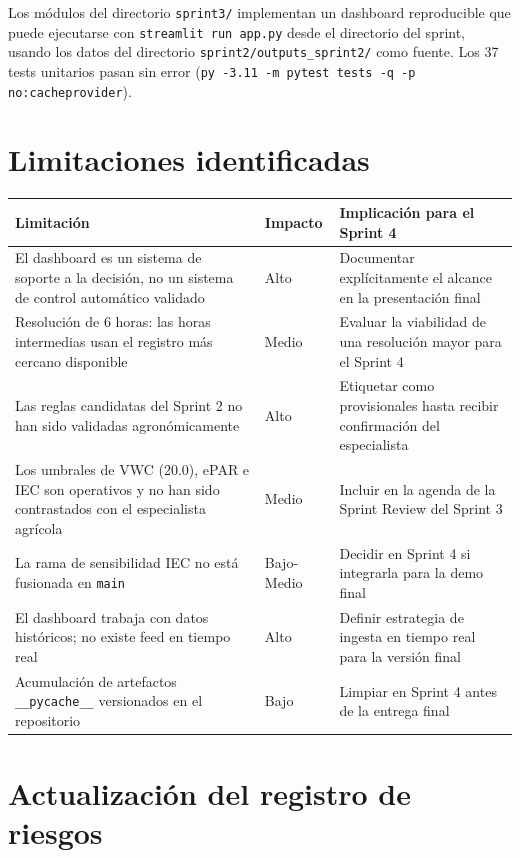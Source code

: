\documentclass[11pt,a4paper]{article}
\begin{document}
Los módulos del directorio \texttt{sprint3/} implementan un dashboard reproducible que
puede ejecutarse con \texttt{streamlit run app.py} desde el directorio del sprint, usando los
datos del directorio \texttt{sprint2/outputs\_sprint2/} como fuente. Los 37 tests unitarios
pasan sin error (\texttt{py -3.11 -m pytest tests -q -p no:cacheprovider}).

\section{Limitaciones identificadas}

\begin{longtable}{p{} p{} p{}}
\textbf{Limitación} & \textbf{Impacto} & \textbf{Implicación para el Sprint 4} \\
\hline
El dashboard es un sistema de soporte a la decisión, no un sistema de control automático validado & Alto & Documentar explícitamente el alcance en la presentación final \\
Resolución de 6 horas: las horas intermedias usan el registro más cercano disponible & Medio & Evaluar la viabilidad de una resolución mayor para el Sprint 4 \\
Las reglas candidatas del Sprint 2 no han sido validadas agronómicamente & Alto & Etiquetar como provisionales hasta recibir confirmación del especialista \\
Los umbrales de VWC (20.0), ePAR e IEC son operativos y no han sido contrastados con el especialista agrícola & Medio & Incluir en la agenda de la Sprint Review del Sprint 3 \\
La rama de sensibilidad IEC no está fusionada en \texttt{main} & Bajo-Medio & Decidir en Sprint 4 si integrarla para la demo final \\
El dashboard trabaja con datos históricos; no existe feed en tiempo real & Alto & Definir estrategia de ingesta en tiempo real para la versión final \\
Acumulación de artefactos \texttt{\_\_pycache\_\_} versionados en el repositorio & Bajo & Limpiar en Sprint 4 antes de la entrega final \\
\end{longtable}

\section{Actualización del registro de riesgos}
\end{document}
